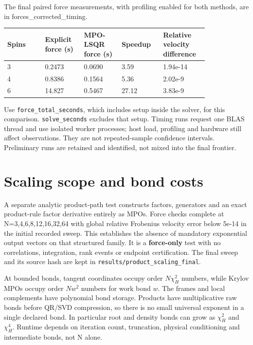 \documentclass[10pt]{article}
\begin{document}
The final paired force measurements, with profiling enabled for both methods,
are in forces\_corrected\_timing.

\begingroup\small\setlength{\tabcolsep}{3pt}\begin{longtable}{p{0.16299999999999998\linewidth}p{0.16299999999999998\linewidth}p{0.16299999999999998\linewidth}p{0.16299999999999998\linewidth}p{0.16299999999999998\linewidth}}\toprule
Spins & Explicit force (s) & MPO-LSQR force (s) & Speedup & Relative velocity difference \\
\midrule\endhead
3 & 0.2473 & 0.0690 & 3.59 & 1.94e-14 \\
4 & 0.8386 & 0.1564 & 5.36 & 2.02e-9 \\
6 & 14.827 & 0.5467 & 27.12 & 3.83e-9 \\
\bottomrule\end{longtable}\endgroup

Use \texttt{force\_total\_seconds}, which includes setup inside the solver, for this
comparison. \texttt{solve\_seconds} excludes that setup. Timing runs request one BLAS
thread and use isolated worker processes; host load, profiling and hardware
still affect observations. They are not repeated-sample confidence intervals.
Preliminary runs are retained and identified, not mixed into the final frontier.

\section*{Scaling scope and bond costs}

A separate analytic product-path test constructs factors, generators and an
exact product-rule factor derivative entirely as MPOs. Force checks complete
at N=3,4,6,8,12,16,32,64 with global relative Frobenius velocity error below
5e-14 in the initial recorded sweep. This establishes the absence of mandatory
exponential output vectors on that structured family. It is a \textbf{force-only}
test with no correlations, integration, rank events or endpoint certification.
The final sweep and its source hash are kept in \texttt{results/product\_scaling\_final}.

At bounded bonds, tangent coordinates occupy order $N\chi_H^2$ numbers, while
Krylov MPOs occupy order $Nw^2$ numbers for work bond $w$. The frames and local
complements have polynomial bond storage. Products have multiplicative raw
bonds before QR/SVD compression, so there is no small universal exponent in a
single declared bond. In particular root and density bonds can grow as
$\chi_H^2$ and $\chi_H^4$. Runtime depends on iteration count, truncation,
physical conditioning and intermediate bonds, not N alone.
\end{document}
